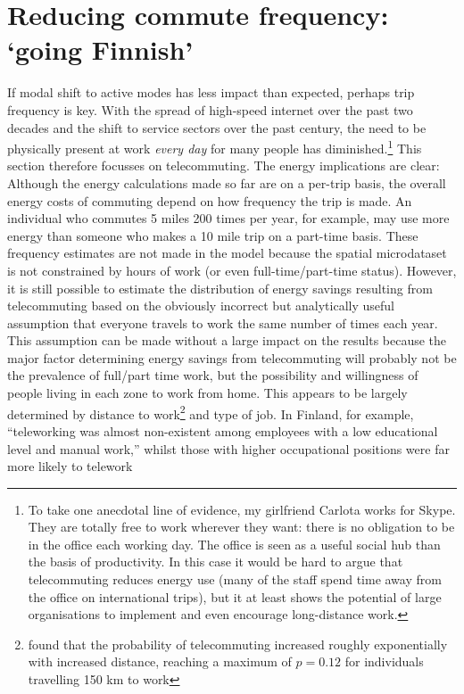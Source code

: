 \section{Reducing commute frequency: `going Finnish'}
If modal shift to active modes has less impact than expected, perhaps
trip frequency is key. With the spread of high-speed internet over the
past two decades and the shift to service sectors over the past century,
the need to be physically present at work \emph{every day} for many people
has
diminished.\footnote{To
take one anecdotal line of evidence, my girlfriend Carlota works for Skype.
They are totally free to work wherever they want: there is no obligation to
be in the office each working day. The office is seen as a useful social hub
than the basis of productivity. In this case it would be hard to argue that
telecommuting reduces energy use (many of the staff spend time away from the
office on international trips), but it at least shows the potential of large
organisations to implement and even encourage long-distance work.
}
This section therefore focusses on telecommuting. The energy implications are clear:
Although the energy calculations made so far are on a per-trip basis, the
overall energy costs of commuting depend on how frequency the trip is made.
An individual who commutes 5 miles 200 times per year, for example, may
use more energy than someone who makes a 10 mile trip on a part-time basis.
These frequency estimates are not made in the model because the spatial
microdataset is not constrained by hours of work (or even full-time/part-time
status). However, it is still possible to estimate the distribution of
energy savings resulting from telecommuting based on the obviously incorrect
but analytically useful assumption that everyone travels to work the same
number of times each year. This assumption can be made without a large impact
on the results because the major factor determining energy savings from
telecommuting will probably not be the prevalence of full/part time work, but
the possibility and willingness of people living in each zone to work from home.
This appears to be largely determined by distance to
work\footnote{\citet{Helminen2007}
found that the probability of telecommuting increased roughly exponentially
with increased distance, reaching a maximum of $p=0.12$ for individuals travelling
150 km to work
}
and type of job. In Finland, for example, ``teleworking was almost non-existent
among employees with a low educational level and manual work,'' whilst those
with higher occupational positions were far more likely to telework
